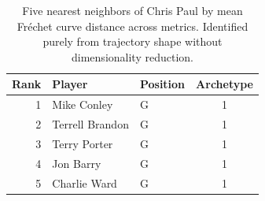 \begin{table}[htbp]
  \centering\small
  \begin{tabular}{rllc}
    \toprule
    Rank & Player & Position & Archetype \\
    \midrule
    1 & Mike Conley & G & 1 \\
    2 & Terrell Brandon & G & 1 \\
    3 & Terry Porter & G & 1 \\
    4 & Jon Barry & G & 1 \\
    5 & Charlie Ward & G & 1 \\
    \bottomrule
  \end{tabular}
  \caption{Five nearest neighbors of Chris Paul by mean Fr\'{e}chet curve distance across metrics. Identified purely from trajectory shape without dimensionality reduction.}
  \label{tab:Chris_Paul_frechet_curve_neighbors}
\end{table}

